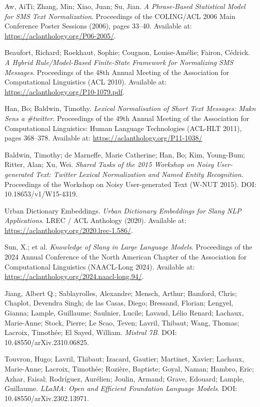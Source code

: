 \documentclass[12pt]{article}
\begin{document}
\begin{thebibliography}{9}
Aw, AiTi; Zhang, Min; Xiao, Juan; Su, Jian.
\textit{A Phrase-Based Statistical Model for SMS Text Normalization}.
Proceedings of the COLING/ACL 2006 Main Conference Poster Sessions (2006), pages 33–40.
Available at: \url{https://aclanthology.org/P06-2005/}.

Beaufort, Richard; Roekhaut, Sophie; Cougnon, Louise-Amélie; Fairon, Cédrick.
\textit{A Hybrid Rule/Model-Based Finite-State Framework for Normalizing SMS Messages}.
Proceedings of the 48th Annual Meeting of the Association for Computational Linguistics (ACL 2010).
Available at: \url{https://aclanthology.org/P10-1079.pdf}.

Han, Bo; Baldwin, Timothy.
\textit{Lexical Normalisation of Short Text Messages: Makn Sens a \#twitter}.
Proceedings of the 49th Annual Meeting of the Association for Computational Linguistics: Human Language Technologies (ACL-HLT 2011), pages 368–378.
Available at: \url{https://aclanthology.org/P11-1038/}

Baldwin, Timothy; de Marneffe, Marie Catherine; Han, Bo; Kim, Young-Bum; Ritter, Alan; Xu, Wei.
\textit{Shared Tasks of the 2015 Workshop on Noisy User-generated Text: Twitter Lexical Normalization and Named Entity Recognition}.
Proceedings of the Workshop on Noisy User-generated Text (W-NUT 2015).
DOI: 10.18653/v1/W15-4319.

Urban Dictionary Embeddings.
\textit{Urban Dictionary Embeddings for Slang NLP Applications}.
LREC / ACL Anthology (2020).
Available at: \url{https://aclanthology.org/2020.lrec-1.586/}.

Sun, X.; et al.
\textit{Knowledge of Slang in Large Language Models}.
Proceedings of the 2024 Annual Conference of the North American Chapter of the Association for Computational Linguistics (NAACL-Long 2024).
Available at: \url{https://aclanthology.org/2024.naacl-long.94/}.

Jiang, Albert Q.; Sablayrolles, Alexandre; Mensch, Arthur; Bamford, Chris; Chaplot, Devendra Singh; de las Casas, Diego; Bressand, Florian; Lengyel, Gianna; Lample, Guillaume; Saulnier, Lucile; Lavaud, Lélio Renard; Lachaux, Marie-Anne; Stock, Pierre; Le Scao, Teven; Lavril, Thibaut; Wang, Thomas; Lacroix, Timothée; El Sayed, William.
\textit{Mistral 7B}.
DOI: 10.48550/arXiv.2310.06825.

Touvron, Hugo; Lavril, Thibaut; Izacard, Gautier; Martinet, Xavier; Lachaux, Marie-Anne; Lacroix, Timothée; Rozière, Baptiste; Goyal, Naman; Hambro, Eric; Azhar, Faisal; Rodríguez, Aurélien; Joulin, Armand; Grave, Edouard; Lample, Guillaume.
\textit{LLaMA: Open and Efficient Foundation Language Models}.
DOI: 10.48550/arXiv.2302.13971.


\end{thebibliography}
\end{document}
